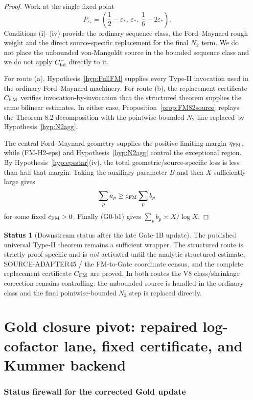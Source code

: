 \documentclass[11pt]{article}
\theoremstyle{definition}
\newtheorem{status}[theorem]{Status}
\theoremstyle{remark}
\newcommand{\1}{\mathbf 1}
\begin{document}
\begin{proof}
Work at the single fixed point
\[
 P_{\varepsilon_*}=
 \left(\frac12-\varepsilon_*,\ \varepsilon_*,\ \frac16-2\varepsilon_*\right).
\]
Conditions (i)--(iv) provide the ordinary sequence class, the Ford--Maynard rough weight and the direct
source-specific replacement for the final $N_2$ term.  We do not place the unbounded von-Mangoldt source in the
bounded sequence class and we do not apply $C^-_{\rm bd}$ directly to it.

For route (a), Hypothesis~\ref{hyp:FullFM} supplies every Type-II invocation used in the ordinary Ford--Maynard
machinery.  For route (b), the replacement certificate $C_{\rm FM}$ verifies invocation-by-invocation that the
structured theorem supplies the same bilinear estimates.  In either case, Proposition~\ref{prop:FM82source}
replays the Theorem-8.2 decomposition with the pointwise-bounded $N_2$ line replaced by
Hypothesis~\ref{hyp:N2agg}.

The central Ford--Maynard geometry supplies the positive limiting margin $\eta_{\rm FM}$, while
(FM-H2-eps) and Hypothesis~\ref{hyp:N2agg} control the exceptional region.  By
Hypothesis~\ref{hyp:epsstar}(iv), the total geometric/source-specific loss is less than half that margin.
Taking the auxiliary parameter $B$ and then $X$ sufficiently large gives
\[
 \sum_pa_p\ge c_{\rm FM}\sum_pb_p
\]
for some fixed $c_{\rm FM}>0$.  Finally (G0-b1) gives $\sum_pb_p\asymp X/\log X$.
\end{proof}

\begin{status}[Downstream status after the late Gate-1B update]
The published universal Type-II theorem remains a sufficient wrapper.  The structured route is strictly
proof-specific and is \emph{not} activated until the analytic structured estimate, SOURCE-ADAPTER45 / the
FM-to-Gate coordinate census, and the complete replacement certificate $C_{\rm FM}$ are proved.  In both routes the V8 class/shrinkage correction remains
controlling: the unbounded source is handled in the ordinary class and the final pointwise-bounded $N_2$ step is
replaced directly.
\end{status}


\part{Gold closure pivot: repaired log-cofactor lane, fixed certificate, and Kummer backend}

\section{Status firewall for the corrected Gold update}
\end{document}
